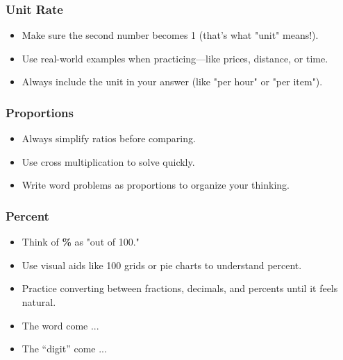 \subsubsection*{Unit Rate}
\begin{itemize}
  \item Make sure the second number becomes 1 (that's what "unit" means!).
  \item Use real-world examples when practicing—like prices, distance, or time.
  \item Always include the unit in your answer (like "per hour" or "per item").
\end{itemize}

\subsubsection*{Proportions}
\begin{itemize}
  \item Always simplify ratios before comparing.
  \item Use cross multiplication to solve quickly.
  \item Write word problems as proportions to organize your thinking.
\end{itemize}

\subsubsection*{Percent}
\begin{itemize}
  \item Think of \textbf{\%} as "out of 100."
  \item Use visual aids like 100 grids or pie charts to understand percent.
  \item Practice converting between fractions, decimals, and percents until it feels natural.
\end{itemize}











\newpage
\begin{itemize}
  \item The word  come ...
  \item The  ``digit'' come ... 
\end{itemize}




